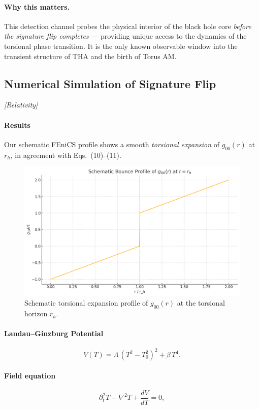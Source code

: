 \documentclass{article}
\newcommand{\grtag}{\textcolor{blue!40!black}{\textit{[Relativity]}}}
\begin{document}
\paragraph{Why this matters.}
This detection channel probes the physical interior of the black hole core
\emph{before the signature flip completes} --- providing unique access to the dynamics
of the torsional phase transition. It is the only known observable window
into the transient structure of THA and the birth of Torus AM.



\subsection{Numerical Simulation of Signature Flip}
\label{sec:FEniCS-simulation}
\grtag

\paragraph{Results}
Our schematic FEniCS profile shows a smooth \emph{torsional expansion} of \(g_{00}(r)\) at \(r_h\), in agreement with Eqs.~(10)–(11).

\begin{figure}[h]
  \centering
  \includegraphics[width=0.7\linewidth]{FEniCS_bounce.png}
  \caption{Schematic torsional expansion profile of \(g_{00}(r)\) at the torsional horizon \(r_h\).}
  \label{fig:FEniCS-bounce}
\end{figure}


\paragraph{Landau–Ginzburg Potential}
\begin{equation}\label{eq:auto69}
V(T) = \Lambda\,(T^2 - T_0^2)^2 + \beta\,T^4.
\end{equation}

\paragraph{Field equation}
\begin{equation}\label{eq:auto70}
\partial_t^2 T - \nabla^2 T + \frac{dV}{dT} = 0,
\end{equation}
\end{document}

